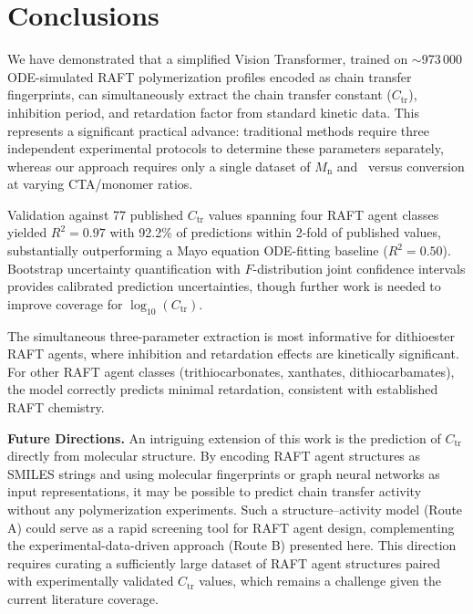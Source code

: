 \documentclass[journal=mamobx,manuscript=article]{achemso}
\begin{document}
\section{Conclusions}

We have demonstrated that a simplified Vision Transformer, trained on $\sim$973\,000 ODE-simulated RAFT polymerization profiles encoded as chain transfer fingerprints, can simultaneously extract the chain transfer constant ($C_\mathrm{tr}$), inhibition period, and retardation factor from standard kinetic data. This represents a significant practical advance: traditional methods require three independent experimental protocols to determine these parameters separately, whereas our approach requires only a single dataset of $M_\mathrm{n}$ and \DJ\ versus conversion at varying CTA/monomer ratios.

Validation against 77 published $C_\mathrm{tr}$ values spanning four RAFT agent classes yielded $R^2 = 0.97$ with 92.2\% of predictions within 2-fold of published values, substantially outperforming a Mayo equation ODE-fitting baseline ($R^2 = 0.50$). Bootstrap uncertainty quantification with $F$-distribution joint confidence intervals provides calibrated prediction uncertainties, though further work is needed to improve coverage for $\log_{10}(C_\mathrm{tr})$.

The simultaneous three-parameter extraction is most informative for dithioester RAFT agents, where inhibition and retardation effects are kinetically significant. For other RAFT agent classes (trithiocarbonates, xanthates, dithiocarbamates), the model correctly predicts minimal retardation, consistent with established RAFT chemistry.

\textbf{Future Directions.} An intriguing extension of this work is the prediction of $C_\mathrm{tr}$ directly from molecular structure. By encoding RAFT agent structures as SMILES strings and using molecular fingerprints or graph neural networks as input representations, it may be possible to predict chain transfer activity without any polymerization experiments. Such a structure--activity model (Route A) could serve as a rapid screening tool for RAFT agent design, complementing the experimental-data-driven approach (Route B) presented here. This direction requires curating a sufficiently large dataset of RAFT agent structures paired with experimentally validated $C_\mathrm{tr}$ values, which remains a challenge given the current literature coverage.
\end{document}
